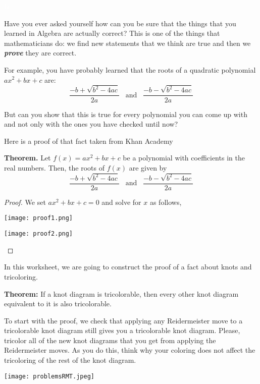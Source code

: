 \documentclass[12pt,letterpaper]{article}
\begin{document}
\textcolor{white}{hi}

Have you ever asked yourself how can you be sure that the things that you learned in Algebra are actually correct? This is one of the things that mathematicians do: we find new statements that we think are true and then we \textbf{\textit{prove}} they are correct. 

For example, you have probably learned that the roots of a quadratic polynomial $ax^2+bx+c$ are:
$$\frac{-b+\sqrt{b^2-4ac}}{2a}\;\;\;\text{and}\;\;\;\frac{-b-\sqrt{b^2-4ac}}{2a}$$

But can you show that this is true for every polynomial you can come up with and not only with the ones you have checked until now?

Here is a proof of that fact taken from Khan Academy

\begin{tcolorbox}[arc=3mm,boxsep=5mm]
\textbf{Theorem.} Let $f(x)=ax^2+bx+c$ be a polynomial with coefficients in the real numbers. Then, the roots of $f(x)$ are given by $$\frac{-b+\sqrt{b^2-4ac}}{2a}\;\;\;\text{and}\;\;\;\frac{-b-\sqrt{b^2-4ac}}{2a}$$
\end{tcolorbox}

\begin{proof}
We set $ax^2+bx+c=0$ and solve for $x$ as follows,
\begin{multicols}{2}
\texttt{[image: proof1.png]}

\texttt{[image: proof2.png]}
\end{multicols}
\end{proof}

In this worksheet, we are going to construct the proof of a fact about knots and tricoloring.


\begin{tcolorbox}[arc=3mm,boxsep=5mm]
\textbf{Theorem:} If a knot diagram is tricolorable, then every other knot diagram equivalent to it is also tricolorable.
\end{tcolorbox}

To start with the proof, we check that applying any Reidermeister move to a tricolorable knot diagram still gives you a tricolorable knot diagram. Please, tricolor all of the new knot diagrams that you get from applying the Reidermeister moves. As you do this, think why your coloring does not affect the tricoloring of the rest of the knot diagram.

\begin{center}
    \texttt{[image: problemsRMT.jpeg]}
\end{center}
\end{document}
